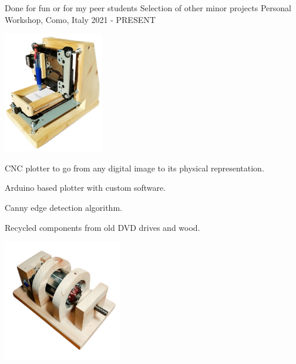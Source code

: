 \begin{cventries}
    \cventry
    {Done for fun or for my peer students} %
    {Selection of other minor projects} %
    {Personal Workshop, Como, Italy} %
    {2021 - PRESENT} %
    {
        \begin{minipage}{0.45\textwidth}
            \vspace{5pt}
            \begin{center}
                \includegraphics[height=150pt]{img/Minors/Gorlu.png}
                \hspace{4cm}
            \end{center}
            \vspace{5pt}
            CNC plotter to go from any digital image to its physical representation.\\
            \begin{cvitems}
                \item {Arduino based plotter with custom software.}
                \item {Canny edge detection algorithm.}
                \item {Recycled components from old DVD drives and wood.}
            \end{cvitems}
            \vspace{4mm}
            \vspace{5pt}
        \end{minipage}
        \hfill
        \begin{minipage}{0.45\textwidth}
            \vspace{5pt}
            \begin{center}
                \includegraphics[height=150pt]{img/Minors/Joppo.png}

\end{center}
\end{minipage}}
\end{cventries}
